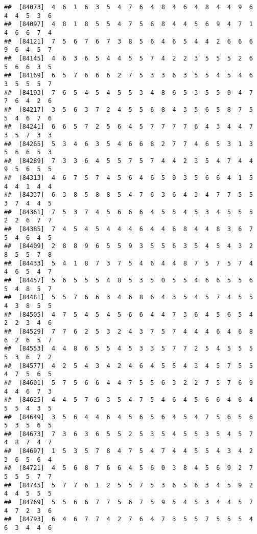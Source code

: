 \documentclass[
]{book}
\begin{document}
\begin{verbatim}
##  [84073]  4  6  1  6  3  5  4  7  6  4  8  4  6  4  8  4  4  9  6  4  4  5  3  6
##  [84097]  4  8  1  8  5  5  4  7  5  6  8  4  4  5  6  9  4  7  1  4  6  6  7  4
##  [84121]  7  5  6  7  6  7  3  8  5  6  4  6  5  4  4  2  6  6  6  9  6  4  5  7
##  [84145]  4  6  3  6  5  4  4  5  5  7  4  2  2  3  5  5  5  2  6  5  6  6  3  5
##  [84169]  6  5  7  6  6  6  2  7  5  3  3  6  3  5  5  4  5  4  6  3  5  5  5  7
##  [84193]  7  6  5  4  5  4  5  5  3  4  8  6  5  3  5  5  9  4  7  7  6  4  2  6
##  [84217]  3  5  6  3  7  2  4  5  5  6  8  4  3  5  6  5  8  7  5  5  4  6  7  6
##  [84241]  6  6  5  7  2  5  6  4  5  7  7  7  7  6  4  3  4  4  7  3  5  7  3  3
##  [84265]  5  3  4  6  3  5  4  6  6  8  2  7  7  4  6  5  3  1  3  5  6  6  5  3
##  [84289]  7  3  3  6  4  5  5  7  5  7  4  4  2  3  5  4  7  4  4  9  5  6  5  5
##  [84313]  4  6  7  5  7  4  5  6  4  6  5  9  3  5  6  6  4  1  5  4  4  1  4  4
##  [84337]  6  3  8  5  8  8  5  4  7  6  3  6  4  3  4  7  7  5  5  3  7  4  4  5
##  [84361]  7  5  3  7  4  5  6  6  6  4  5  5  4  5  3  4  5  5  5  2  2  6  7  7
##  [84385]  7  4  5  4  5  4  4  4  6  4  4  6  8  4  4  8  3  6  7  5  4  6  4  5
##  [84409]  2  8  8  9  6  5  5  9  3  5  5  6  3  5  4  5  4  3  2  8  5  5  7  8
##  [84433]  5  4  1  8  7  3  7  5  4  6  4  4  8  7  5  7  5  7  4  4  6  5  4  7
##  [84457]  5  6  5  5  5  4  8  5  3  5  0  5  5  4  6  6  5  5  6  5  4  8  5  7
##  [84481]  5  5  7  6  6  3  4  6  8  6  4  3  5  4  5  7  4  5  5  4  3  8  5  5
##  [84505]  4  7  5  4  5  4  5  6  6  4  4  7  3  6  4  5  6  5  4  2  2  3  4  6
##  [84529]  7  7  6  2  5  3  2  4  3  7  5  7  4  4  4  6  4  6  8  6  2  6  5  7
##  [84553]  4  4  8  6  5  5  4  5  3  3  5  7  7  2  5  4  5  5  5  5  3  6  7  2
##  [84577]  4  2  5  4  3  4  2  4  6  4  5  5  4  3  4  5  7  5  5  4  7  5  6  5
##  [84601]  5  7  5  6  6  4  4  7  5  5  6  3  2  2  7  5  7  6  9  4  4  6  7  3
##  [84625]  4  4  5  7  6  3  5  4  7  5  4  6  4  5  6  6  4  6  4  5  5  4  3  5
##  [84649]  3  5  6  4  4  6  4  5  6  5  6  4  5  4  7  5  6  5  6  5  3  5  6  5
##  [84673]  7  3  6  3  6  5  5  2  5  3  5  4  5  5  3  5  4  5  7  4  8  7  4  7
##  [84697]  1  5  3  5  7  8  4  7  5  4  7  4  4  5  5  4  3  4  2  3  6  5  6  4
##  [84721]  4  5  6  8  7  6  6  4  5  6  0  3  8  4  5  6  9  2  7  5  5  5  7  7
##  [84745]  5  7  7  6  1  2  5  5  7  5  3  6  5  6  3  4  5  9  2  4  4  5  5  5
##  [84769]  5  5  6  6  7  7  5  6  7  5  9  5  4  5  3  4  4  5  7  4  7  2  3  6
##  [84793]  6  4  6  7  7  4  2  7  6  4  7  3  5  5  7  5  5  5  4  6  3  4  4  6

\end{verbatim}
\end{document}
